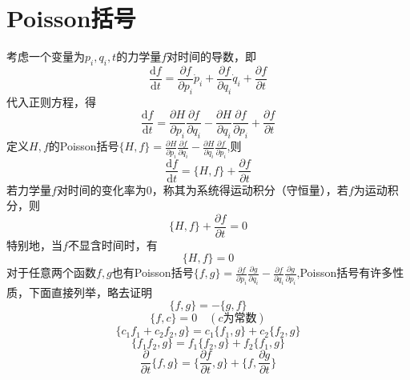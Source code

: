\section{Poisson括号}
考虑一个变量为$p_i,q_i,t$的力学量$f$对时间的导数，即
\begin{equation}
    \frac{\mathrm{d}f}{\mathrm{d}t}=\frac{\partial f}{\partial p_i}\dot{p}_i+\frac{\partial f}{\partial q_i}\dot{q}_i
    +\frac{\partial f}{\partial t}
\end{equation}
代入正则方程，得
\begin{equation}
    \frac{\mathrm{d}f}{\mathrm{d}t}=\frac{\partial H}{\partial p_i}\frac{\partial f}{\partial q_i}-
    \frac{\partial H}{\partial q_i}\frac{\partial f}{\partial p_i}+\frac{\partial f}{\partial t}
\end{equation}
定义$H,f$的Poisson括号$\displaystyle{\{H,f\}=\frac{\partial H}{\partial p_i}\frac{\partial f}{\partial q_i}
-\frac{\partial H}{\partial q_i}\frac{\partial f}{\partial p_i}}$,则
\begin{equation}
    \frac{\mathrm{d}f}{\mathrm{d}t}=\{H,f\}+\frac{\partial f}{\partial t}
\end{equation}
若力学量$f$对时间的变化率为0，称其为系统得运动积分（守恒量），若$f$为运动积分，则
\begin{equation}
    \{H,f\}+\frac{\partial f}{\partial t}=0
\end{equation}
特别地，当$f$不显含时间时，有
\begin{equation}
    \{H,f\}=0
\end{equation}
对于任意两个函数$f,g$也有Poisson括号$\displaystyle{\{f,g\}=\frac{\partial f}{\partial p_i}\frac{\partial g}{\partial q_i}
-\frac{\partial f}{\partial q_i}\frac{\partial g}{\partial p_i}}$,Poisson括号有许多性质，下面直接列举，略去证明
\begin{equation}
    \{f,g\}=-\{g,f\}
\end{equation}
\begin{equation}
    \{f,c\}=0\quad(c\mbox{为常数})
\end{equation}
\begin{equation}
    \{c_1f_1+c_2f_2,g\}=c_1\{f_1,g\}+c_2\{f_2,g\}
\end{equation}
\begin{equation}
    \{f_1f_2,g\}=f_1\{f_2,g\}+f_2\{f_1,g\}
\end{equation}
\begin{equation}
    \frac{\partial}{\partial t}\{f,g\}=\{\frac{\partial f}{\partial t},g\}+\{f,\frac{\partial g}{\partial t}\}
\end{equation}
